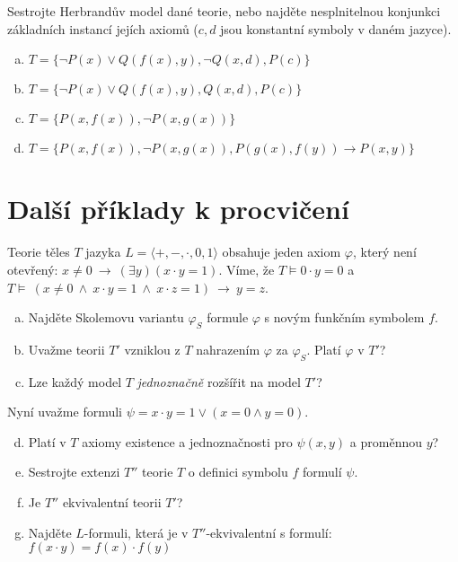 \begin{problem} 
    
    Sestrojte Herbrandův model dané teorie, nebo najděte nesplnitelnou konjunkci základních instancí jejích axiomů ($c,d$ jsou konstantní symboly v daném jazyce).    
    \begin{enumerate}[(a)]
        \item $T=\{\neg P(x)\vee Q(f(x),y), \neg Q(x,d), P(c)\}$
        \item $T=\{\neg P(x)\vee Q(f(x),y), Q(x,d), P(c)\}$
        \item $T=\{P(x,f(x)),\neg P(x,g(x))\}$
        \item $T=\{P(x,f(x)),\neg P(x,g(x)), P(g(x),f(y)) \to P(x,y)\}$
    \end{enumerate}

    \begin{solution}
                    
    \end{solution}

\end{problem}

        
\section*{Další příklady k procvičení}


\begin{problem}

    Teorie těles $T$ jazyka $L=\langle +,-,\cdot,0,1\rangle$ obsahuje jeden axiom $\varphi$, který není otevřený: $x\neq 0\ \to\ (\exists y)(x\cdot y=1)$. Víme, že $T\models 0\cdot y=0$ a $T\models\ (x\ne 0\ \wedge\ x\cdot y=1\ \wedge\ x\cdot z=1)\ \to\ y=z$.
    \begin{enumerate}[(a)]
        \item Najděte Skolemovu variantu $\varphi_S$ formule $\varphi$ s novým funkčním symbolem $f$.
        \item Uvažme teorii $T'$ vzniklou z $T$ nahrazením $\varphi$ za $\varphi_S$. Platí $\varphi$ v $T'$?
        \item Lze každý model $T$ \emph{jednoznačně} rozšířit na model $T'$?
    \end{enumerate}
    Nyní uvažme formuli $\psi=x\cdot y=1\vee  (x=0 \wedge y=0)$.
    \begin{enumerate}[(a)]
        \setcounter{enumi}{3}
        \item Platí v $T$ axiomy existence a jednoznačnosti pro $\psi(x,y)$ a proměnnou $y$?
        \item Sestrojte extenzi $T''$ teorie $T$ o definici symbolu $f$ formulí $\psi$.
        \item Je $T''$ ekvivalentní teorii $T'$?
        \item Najděte $L$-formuli, která je v $T''$-ekvivalentní s formulí:
        $f(x\cdot y)=f(x)\cdot f(y)$
    \end{enumerate}

\end{problem}


